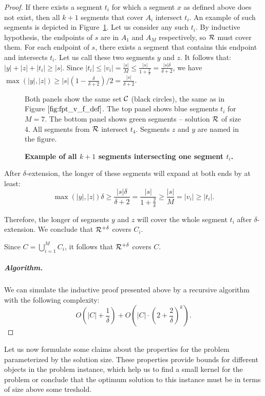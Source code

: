 \begin{proof}
If there exists a segment $t_i$ for which a segment $x$ as defined above
does not exist, then all $k+1$ segments that cover
$A_i$ intersect $t_i$.
An example of such segments is depicted in Figure~\ref{fig:fpt_tricky_case}.
Let us consider any such $t_i$.
By inductive hypothesis, the endpoints of $s$ are
in $A_1$ and $A_M$ respectively, so $\mathcal{R}$ must cover them.
For each endpoint of $s$, there exists
a segment that contains this endpoint and intersects $t_i$.
Let us call these two segments $y$ and $z$. It follows that:
$|y| + |z| + |t_i| \ge |s|$.
Since $|t_i| \le |v_i| = \frac{|s|}{M} \le \frac{|s|}{1+\frac{2}{\delta}} = \frac{|s|\delta}{\delta+2}$,
we have $\max(|y|, |z|) \ge |s|(1-\frac{\delta}{\delta+2})/2 = \frac{|s|}{\delta+2}$.

\begin{figure}[h]
\begin{center}
\def\svgwidth{\columnwidth}

\end{center}
\caption{\textbf{Example of all $k+1$ segments intersecting one segment $t_i$.}}
Both panels show the same set $\mathcal{C}$ (black circles),
the same as in Figure $\ref{fig:fpt_v_f_def}$.
The top panel shows blue segments $t_i$ for $M=7$.
The bottom panel shows green segments -- solution $\mathcal{R}$ of size 4.
All segments from $\mathcal{R}$ intersect $t_4$.
Segments $z$ and $y$ are named in the figure.
\label{fig:fpt_tricky_case}
\end{figure}

After $\delta$-extension, the longer of these segments will
expand at both ends by at least:
$$\max(|y|, |z|)\delta \ge \frac{|s|\delta}{\delta+2} =
\frac{|s|}{1+\frac{2}{\delta}} \ge \frac{|s|}{M} = |v_i| \ge |t_i|.$$

Therefore, the longer of segments $y$ and $z$ will cover the whole segment $t_i$
after $\delta$-extension. We conclude that $\mathcal{R}^{+\delta}$ covers $C_i$.

Since $C = \bigcup_{i=1}^M C_i$,
it follows that $\mathcal{R}^{+\delta}$ covers $C$.


\subparagraph{Algorithm.}

We can simulate the inductive proof presented above by a recursive algorithm with
the following complexity:
$$O\left(|C|+\frac{1}{\delta}\right) + O\left(|C|\cdot\left(2+\frac{2}{\delta}\right)^k\right).$$

\end{proof}

Let us now formulate some claims about the
properties for the problem parameterized by the solution size.
These properties provide bounds for different
objects in the problem instance,
which help us to find a small kernel for the problem
or conclude that the optimum
solution to this instance must be in terms of size above some treshold.

